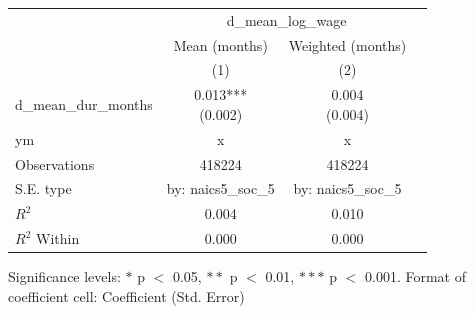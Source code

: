 \renewcommand\cellalign{t}
\begin{threeparttable}
\begin{tabular}{lccc}
\toprule
 & \multicolumn{2}{c}{d_mean_log_wage} \\
\cmidrule(lr){2-3} 
 & Mean (months) & Weighted (months) \\
 & (1) & (2) \\
\midrule
\addlinespace
d_mean_dur_months & \makecell{0.013*** \\ (0.002)} & \makecell{0.004 \\ (0.004)} \\
\midrule
\addlinespace
ym & x & x \\
\midrule
\addlinespace
Observations & 418224 & 418224 \\
S.E. type & by: naics5_soc_5 & by: naics5_soc_5 \\
$R^2$ & 0.004 & 0.010 \\
$R^2$ Within & 0.000 & 0.000 \\
\bottomrule
\end{tabular}
\footnotesize Significance levels: $*$ p $<$ 0.05, $**$ p $<$ 0.01, $***$ p $<$ 0.001. Format of coefficient cell: Coefficient 
 (Std. Error)
\end{threeparttable}